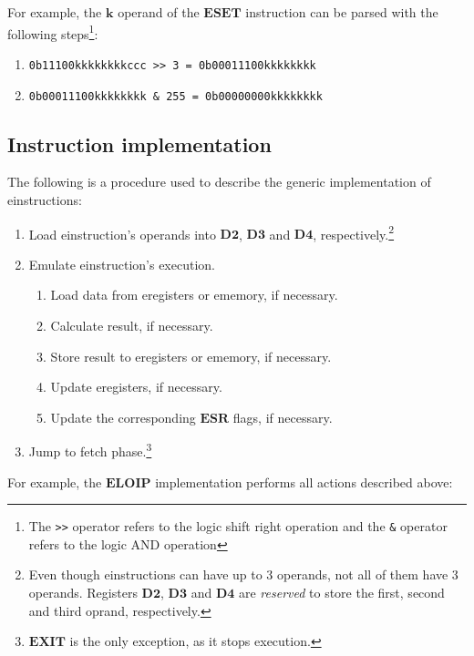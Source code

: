 \documentclass[11pt, a4paper]{article}
\begin{document}
For example, the $\mathbf{k}$ operand of the $\mathbf{ESET}$ instruction can be parsed with the
following steps\footnote{The \texttt{>>} operator refers to the logic shift right operation and the
	\texttt{\&} operator refers to the logic AND operation}:
\begin{enumerate}
	\item \verb|0b11100kkkkkkkkccc >> 3 = 0b00011100kkkkkkkk|
	\item \verb|0b00011100kkkkkkkk & 255 = 0b00000000kkkkkkkk|
\end{enumerate}

\subsection{Instruction implementation}
The following is a procedure used to describe the generic implementation of einstructions:
\begin{enumerate}[label*=\arabic*.]
	\item Load einstruction's operands into $\mathbf{D2}$, $\mathbf{D3}$ and $\mathbf{D4}$,
		respectively.\footnote{Even though einstructions can have up to 3 operands, not all of them
		have 3 operands. Registers $\mathbf{D2}$, $\mathbf{D3}$ and $\mathbf{D4}$ are \emph{reserved} to store the first, second and
	third oprand, respectively.}
	\item Emulate einstruction's execution.
	\begin{enumerate}[label*=\arabic*.]
		\item Load data from eregisters or ememory, if necessary.
		\item Calculate result, if necessary.
		\item Store result to eregisters or ememory, if necessary.
		\item Update eregisters, if necessary.
		\item Update the corresponding $\mathbf{ESR}$ flags, if necessary.
	\end{enumerate}
	\item Jump to fetch phase.\footnote{$\mathbf{EXIT}$ is the only
		exception, as it stops execution.}
\end{enumerate}
\vfill
\pagebreak
For example, the $\mathbf{ELOIP}$ implementation performs all actions described above:
\end{document}
